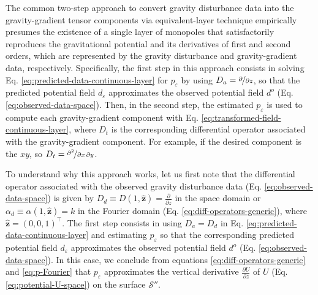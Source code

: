 The common two-step approach to convert 
gravity disturbance data into the gravity-gradient tensor components
\citep[e.g.,][]{piauilino_etal2019_seg, oliveirajr_etal2023, piauilino_etal2025b} via equivalent-layer 
technique empirically presumes the existence of a single layer of 
monopoles that satisfactorily reproduces the gravitational potential and 
its derivatives of first and second orders, which are represented by the 
gravity disturbance and gravity-gradient data, respectively. 
Specifically, the first step in this approach consists in solving Eq. 
\ref{eq:predicted-data-continuous-layer} 
for $p_{\varepsilon}$ by using $D_{a} = \nicefrac{\partial}{\partial z}$, 
so that the predicted potential field $d_{\varepsilon}$ approximates the observed potential 
field $d^{o}$ (Eq. \ref{eq:observed-data-space}).
Then, in the second step, the estimated $p_{\varepsilon}$ is used to compute each 
gravity-gradient component with
Eq. \ref{eq:transformed-field-continuous-layer}, where $D_{t}$ is the corresponding 
differential operator associated with the gravity-gradient component.
For example, if the desired component is the $xy$, so 
$D_{t} = \nicefrac{\partial^{2}}{\partial x \, \partial y}$.

To understand why this approach works, let us first note that 
the differential operator associated with the observed gravity disturbance data (Eq. 
\ref{eq:observed-data-space}) is given by $D_{d} \equiv D(1, \hat{\mathbf{z}}) = 
\tfrac{\partial}{\partial z}$ in the space domain
or $\alpha_{d} \equiv \alpha(1, \hat{\mathbf{z}}) = k$ in the Fourier domain (Eq. 
\ref{eq:diff-operators-generic}),
where $\hat{\mathbf{z}} = (0, 0, 1)^{\top}$.
The first step consists in using $D_{a} = D_{d}$ in Eq. 
\ref{eq:predicted-data-continuous-layer} and 
estimating $p_{\varepsilon}$ so that the corresponding predicted potential field 
$d_{\varepsilon}$ approximates
the observed potential field $d^{o}$ (Eq. \ref{eq:observed-data-space}).
In this case, we conclude from equations \ref{eq:diff-operators-generic} and 
\ref{eq:p-Fourier} that $p_{\varepsilon}$ 
approximates the vertical derivative $\tfrac{\partial U}{\partial z}$ of $U$
(Eq. \ref{eq:potential-U-space}) on the surface $\mathcal{S}''$.

